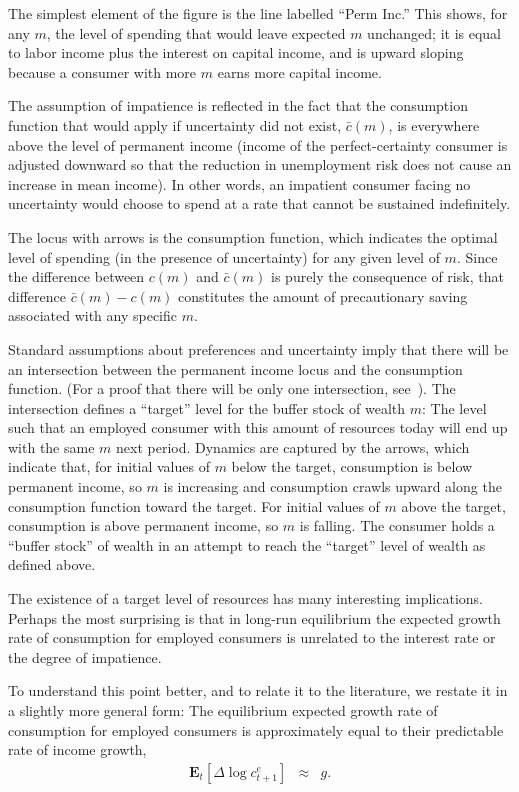 The simplest element of the figure is the line labelled ``Perm Inc.'' This shows, for any ${m}$, the
level of spending that would leave expected ${m}$ unchanged; it is equal to labor income plus the interest on
capital income, and is upward sloping because a consumer with more ${m}$ earns more capital income.

The assumption of impatience is reflected in the fact that the
consumption function that would apply if uncertainty did not exist,
$\bar{c}({m})$, is everywhere above the level of permanent income
(income of the perfect-certainty consumer is adjusted downward so that
the reduction in unemployment risk does not cause an increase in mean
income).  In other words, an impatient consumer facing no uncertainty
would choose to spend at a rate that cannot be sustained indefinitely.

The locus with arrows is the consumption function, which indicates the
optimal level of spending (in the presence of uncertainty) for any
given level of ${m}$.  Since the difference between ${c}({m})$ and
$\bar{c}({m})$ is purely the consequence of risk, that difference
$\bar{c}({m})-{c}({m})$ constitutes the amount of precautionary saving
associated with any specific ${m}$.

Standard assumptions about preferences and uncertainty imply that
there will be an intersection between the permanent income locus and
the consumption function.  (For a proof that there will be only one
intersection, see~\cite{BufferStockTheory}).  The intersection defines
a ``target'' level for the buffer stock of wealth ${m}$: The level such that an employed consumer
with this amount of resources today will end up with the same $m$ next period.  
Dynamics are captured by the
arrows, which indicate that, for initial
values of ${m}$ below the target, consumption is below permanent
income, so $m$ is increasing and consumption crawls upward along the
consumption function toward the target.  For initial values of
${m}$ above the target, consumption is above permanent income, so $m$
is falling.  The consumer holds a ``buffer stock'' of wealth in an attempt
to reach the ``target'' level of wealth as defined above.  

The existence of a target level of resources has many interesting
implications.  Perhaps the most surprising is that in long-run equilibrium the
expected growth rate of consumption for employed consumers is
unrelated to the interest rate or the degree of impatience.

To understand this point better, and to relate it to the literature,
we restate it in a slightly more general form:  The equilibrium
expected growth rate of consumption for employed consumers is
approximately equal to their predictable rate of income growth,
\begin{eqnarray}
  \label{eq:CGrow}
  \mathbf{E}_{t}[\Delta \log {c}_{t+1}^{e}] & \approx & g.
\end{eqnarray}

